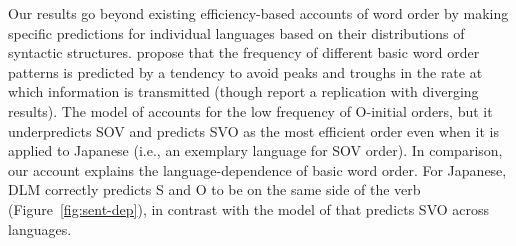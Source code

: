 \documentclass[9pt,twocolumn,twoside,lineno]{pnas-new}
\begin{document}


Our results go beyond existing efficiency-based accounts of word order by making specific predictions for individual languages based on their distributions of syntactic structures.
\cite{maurits2010why} propose that the frequency of different basic word order patterns is predicted by a tendency to avoid peaks and troughs in the rate at which information is transmitted (though \cite{gonering-morgan-2020-processing} report a replication with diverging results).
The model of \cite{maurits2010why} accounts for the low frequency of O-initial orders, but it underpredicts SOV and predicts SVO as the most efficient order even when it is applied to Japanese (i.e., an exemplary language for SOV order).
In comparison, our account explains the language-dependence of basic word order.
For Japanese, DLM correctly predicts S and O to be on the same side of the verb (Figure~\ref{fig:sent-dep}), in contrast with the model of \cite{maurits2010why} that predicts SVO across languages. %


\end{document}
